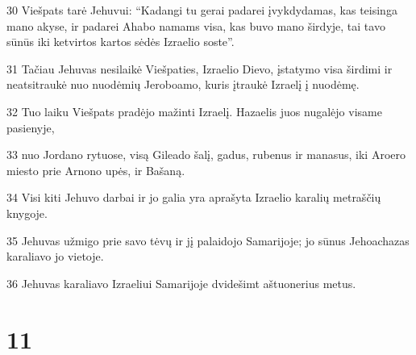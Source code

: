 \par 30 Viešpats tarė Jehuvui: “Kadangi tu gerai padarei įvykdydamas, kas teisinga mano akyse, ir padarei Ahabo namams visa, kas buvo mano širdyje, tai tavo sūnūs iki ketvirtos kartos sėdės Izraelio soste”. 
\par 31 Tačiau Jehuvas nesilaikė Viešpaties, Izraelio Dievo, įstatymo visa širdimi ir neatsitraukė nuo nuodėmių Jeroboamo, kuris įtraukė Izraelį į nuodėmę. 
\par 32 Tuo laiku Viešpats pradėjo mažinti Izraelį. Hazaelis juos nugalėjo visame pasienyje, 
\par 33 nuo Jordano rytuose, visą Gileado šalį, gadus, rubenus ir manasus, iki Aroero miesto prie Arnono upės, ir Bašaną. 
\par 34 Visi kiti Jehuvo darbai ir jo galia yra aprašyta Izraelio karalių metraščių knygoje. 
\par 35 Jehuvas užmigo prie savo tėvų ir jį palaidojo Samarijoje; jo sūnus Jehoachazas karaliavo jo vietoje. 
\par 36 Jehuvas karaliavo Izraeliui Samarijoje dvidešimt aštuonerius metus.



\chapter{11}


